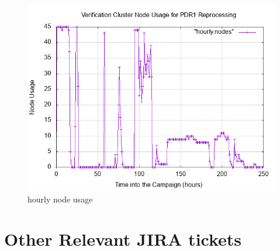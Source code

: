 \documentclass[DM,authoryear,toc]{lsstdoc}
\begin{document}
\begin{figure}[htbp]
        \begin{center}
                 \includegraphics[width=\textwidth]{figures/nodeUtilization}
                 \caption{hourly node usage \label{fig:node}}
        \end{center}
\end{figure}

\section{Other Relevant JIRA tickets}



\end{document}
